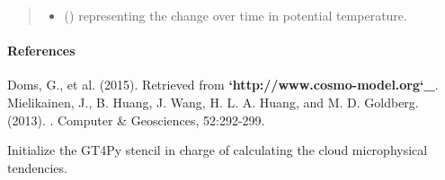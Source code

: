\documentclass[letterpaper,10pt,english]{sphinxmanual}
\begin{document}
\begin{fulllineitems}
\begin{fulllineitems}
\begin{quote}
\begin{description}
\begin{itemize}
\item {} 
 () \textendash{}  representing the change over time in potential temperature.

\end{itemize}


\end{description}\end{quote}
\paragraph{References}

Doms, G., et al. (2015).  Retrieved from {\color{red}\bfseries{}{}`http://www.cosmo-model.org{}`\_}.              Mielikainen, J., B. Huang, J. Wang, H. L. A. Huang, and M. D. Goldberg. (2013).                         . Computer \& Geosciences, 52:292-299.

\end{fulllineitems}


\begin{fulllineitems}
\label{\detokenize{api:parameterizations.slow_tendency_microphysics_kessler_wrf_saturation.SlowTendencyMicrophysicsKesslerWRFSaturation._stencil_tendency_initialize}}
Initialize the GT4Py stencil in charge of calculating the cloud microphysical tendencies.

\end{fulllineitems}



\end{fulllineitems}
\end{document}

